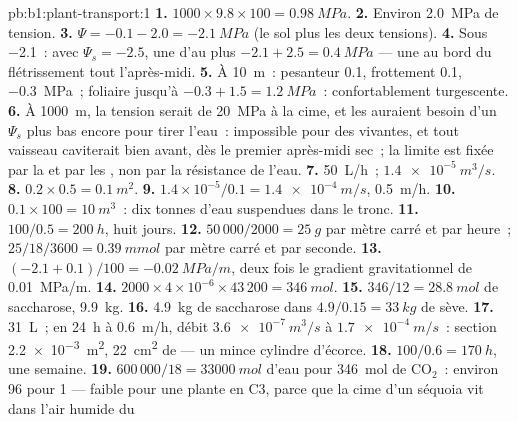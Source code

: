 \begin{solution}{pb:b1:plant-transport:1}
\textbf{1.} $1000\times 9.8\times 100 = \qty{0.98}{MPa}$.
\textbf{2.} Environ \qty{2.0}{MPa} de tension.
\textbf{3.} $\Psi = -0.1 - 2.0 = \qty{-2.1}{MPa}$ (le sol plus les deux
tensions).
\textbf{4.} Sous \qty{-2.1}{}~: avec $\Psi_s = -2.5$, une 
d'au plus $-2.1 + 2.5 = \qty{0.4}{MPa}$ --- une  au bord du
flétrissement tout l'après-midi.
\textbf{5.} À \qty{10}{m}~: pesanteur \qty{0.1}{}, frottement
\qty{0.1}{},  \qty{-0.3}{MPa}~;  foliaire jusqu'à
$-0.3 + 1.5 = \qty{1.2}{MPa}$~: confortablement turgescente.
\textbf{6.} À \qty{1000}{m}, la tension serait de \qty{20}{MPa} à la
cime, et les  auraient besoin d'un $\Psi_s$ plus bas encore
pour tirer l'eau~: impossible pour des  vivantes, et tout
vaisseau caviterait bien avant, dès le premier après-midi sec~; la
limite est fixée par la  et par les , non par la
résistance de l'eau.
\textbf{7.} \qty{50}{L/h}~; $\qty{1.4e-5}{m^3/s}$.
\textbf{8.} $0.2\times 0.5 = \qty{0.1}{m^2}$.
\textbf{9.} $1.4\times 10^{-5}/0.1 = \qty{1.4e-4}{m/s}$, \qty{0.5}{m/h}.
\textbf{10.} $0.1\times 100 = \qty{10}{m^3}$~: dix tonnes d'eau suspendues dans le tronc.
\textbf{11.} $100/0.5 = \qty{200}{h}$, huit jours.
\textbf{12.} $50\,000/2000 = \qty{25}{g}$ par mètre carré et par heure~;
$25/18/3600 = \qty{0.39}{mmol}$ par mètre carré et par seconde.
\textbf{13.} $(-2.1 + 0.1)/100 = \qty{-0.02}{MPa/m}$, deux fois le
gradient gravitationnel de \qty{0.01}{MPa/m}.
\textbf{14.} $2000\times 4\times 10^{-6}\times 43\,200 = \qty{346}{mol}$.
\textbf{15.} $346/12 = \qty{28.8}{mol}$ de saccharose, \qty{9.9}{kg}.
\textbf{16.} \qty{4.9}{kg} de saccharose dans $4.9/0.15 = \qty{33}{kg}$
de sève.
\textbf{17.} \qty{31}{L}~; en \qty{24}{h} à \qty{0.6}{m/h}, débit
$\qty{3.6e-7}{m^3/s}$ à $\qty{1.7e-4}{m/s}$~: section
\qty{2.2e-3}{m^2}, \qty{22}{cm^2} de  --- un mince cylindre
d'écorce.
\textbf{18.} $100/0.6 = \qty{170}{h}$, une semaine.
\textbf{19.} $600\,000/18 = \qty{33000}{mol}$ d'eau pour
\qty{346}{mol} de $\mathrm{CO_2}$~: environ 96 pour 1 --- faible pour une
plante en C3, parce que la cime d'un séquoia vit dans l'air humide du

\end{solution}
